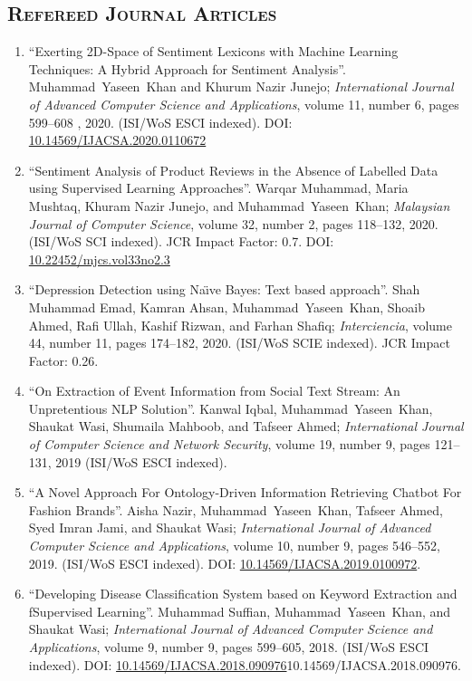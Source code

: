 \documentclass[a4paper, 10pt]{article}
\begin{document}
\subsection*{\normalfont\textsc{ Refereed Journal Articles}}
\begin{enumerate}
\itemsep-4pt 

	\item ``Exerting 2D-Space of Sentiment Lexicons with Machine Learning Techniques: A Hybrid Approach for Sentiment Analysis''. \textcolor{NavyBlue}{Muhammad~Yaseen~Khan} and Khurum Nazir Junejo; \emph{International Journal of Advanced Computer Science and Applications}, volume 11, number 6, pages 599--608
, 2020. (ISI/WoS ESCI indexed). DOI: \url{10.14569/IJACSA.2020.0110672}
       
    \item ``Sentiment Analysis of Product Reviews in the Absence of Labelled Data using Supervised Learning Approaches''. Warqar Muhammad, Maria Mushtaq, Khuram Nazir Junejo, and \textcolor{NavyBlue}{Muhammad~Yaseen~Khan}; \emph{Malaysian Journal of Computer Science}, volume 32, number 2, pages 118--132, 2020. (ISI/WoS SCI indexed). JCR Impact Factor: 0.7. DOI: \url{10.22452/mjcs.vol33no2.3}
    
    \item ``Depression Detection using Na\"{\i}ve Bayes: Text based approach''. Shah Muhammad Emad, Kamran Ahsan, \textcolor{NavyBlue}{Muhammad~Yaseen~Khan}, Shoaib Ahmed, Rafi Ullah, Kashif Rizwan, and Farhan Shafiq; \emph{Interciencia}, volume 44, number 11, pages 174--182, 2020. (ISI/WoS SCIE indexed). JCR Impact Factor: 0.26.
	
	\item ``On Extraction of Event Information from Social Text Stream: An Unpretentious NLP Solution''. Kanwal Iqbal, \textcolor{NavyBlue}{Muhammad~Yaseen~Khan}, Shaukat Wasi, Shumaila Mahboob, and Tafseer Ahmed; \emph{International Journal of Computer Science and Network Security}, volume 19, number 9, pages 121--131, 2019 (ISI/WoS ESCI indexed).
 
	\item ``A Novel Approach For Ontology-Driven Information Retrieving Chatbot For Fashion Brands''. Aisha Nazir, \textcolor{NavyBlue}{Muhammad~Yaseen~Khan}, Tafseer Ahmed, Syed Imran Jami, and Shaukat Wasi; \emph{International Journal of Advanced Computer Science and Applications}, volume 10, number 9, pages 546--552, 2019. (ISI/WoS ESCI indexed). DOI: \url{10.14569/IJACSA.2019.0100972}.
      
	\item ``Developing Disease Classification System based on Keyword Extraction and fSupervised Learning''. Muhammad Suffian, \textcolor{NavyBlue}{Muhammad~Yaseen~Khan}, and Shaukat Wasi; \emph{International Journal of Advanced Computer Science and Applications}, volume 9, number 9, pages 599--605, 2018. (ISI/WoS ESCI indexed). DOI: \url{10.14569/IJACSA.2018.090976}{10.14569/IJACSA.2018.090976}.
\end{enumerate}
\end{document}
